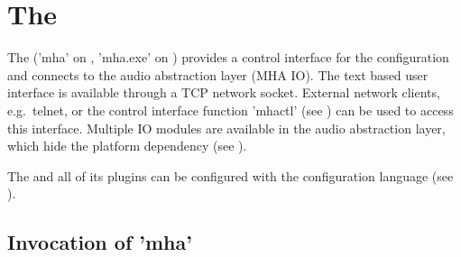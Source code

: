 
\section{The \mhad{}}\label{sec:linuxmhaserver}\label{sec:frameworks}

The \mhad{} ('mha' on \Linux{}, 'mha.exe' on \Windows{}) provides a
control interface for the configuration and connects to the audio
abstraction layer (MHA IO).
%
The text based user interface is available through a TCP network
socket.
%
External network clients, e.g.\ telnet, or the \Matlab{} control
interface function 'mhactl' (see ) can be used
to access this interface.
%
Multiple IO modules are available in the audio abstraction layer,
which hide the platform dependency (see
).
%

The \mhad{} and all of its plugins can be configured with the \mha{}
configuration language (see ).
%


\subsection{Invocation of 'mha'}

